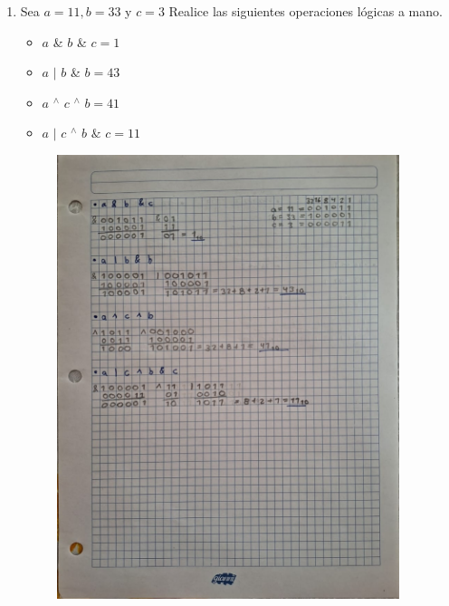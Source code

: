 \documentclass[12pt]{article}
\begin{document}
\begin{enumerate}[leftmargin=*]
        \newpage
        \item Sea $a = 11 , b = 33$ y $c = 3$ Realice las siguientes operaciones lógicas a mano.
        \begin{itemize}[leftmargin=*]
            \item $a$ \& $b$ \& $c = 1$
            \item $a$ $\mid$ $b$ \& $b = 43$ 
            \item $a$ $^{\wedge}$ $c$ $^{\wedge}$ $b = 41$
            \item $a$ $\mid$ $c$ $^{\wedge}$ $b$ $\&$ $c = 11$
        \end{itemize}
        \begin{figure}[ht]
            \includegraphics[width = 10cm, center]{E2.jpg}
        \end{figure}


\end{enumerate}
\end{document}
